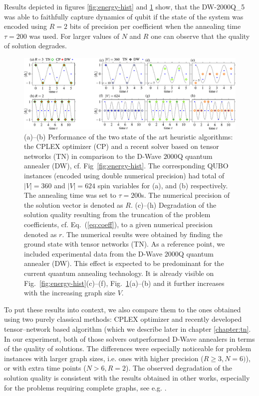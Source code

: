 Results depicted in figures \ref{fig:energy-hist} and \ref{fig:cplex_tn_dwave}
show, that the DW-2000Q\_{5} was able to faithfully capture dynamics of qubit
if the state of the system was encoded using $R=2$ bits of precision per
coefficient when the annealing time $\tau=200$ was used. For larger values of
$N$ and $R$ one can observe that the quality of solution degrades.

\begin{figure}
  \centering
  \includegraphics[width=\textwidth]{figures/fig34_merge.pdf}
  \caption{ (a)--(b) Performance of the two state of the art heuristic
    algorithms: the CPLEX optimizer (CP) and a recent solver based on tensor
    networks (TN) in comparison to the D-Wave $2000$Q quantum annealer (DW),
    cf. Fig~\ref{fig:energy-hist}. The corresponding QUBO instances (encoded
    using double numerical precision) had total of $|V|=360$ and $|V|=624$
    spin variables for (a), and (b) respectively. The annealing time was set
    to $\tau=200$\textmu{}s. The numerical precision of the solution vector is
    denoted as $R$.%
    (c)--(h) Degradation of the solution quality resulting from the truncation
    of the problem coefficients, cf. Eq.~(\ref{eq:coeff}), to a given
    numerical precision denoted as $r$. The numerical results were obtained by
    finding the ground state with tensor networks (TN). As a reference point,
    we included experimental data from the D-Wave $2000$Q quantum annealer
    (DW). This effect is expected to be predominant for the current quantum
    annealing technology. It is already visible on
    Fig.~\ref{fig:energy-hist}(c)--(f), Fig.~\ref{fig:cplex_tn_dwave}(a)--(b)
    and it further increases with the increasing graph size $V$. }
  \label{fig:cplex_tn_dwave}
\end{figure}

To put these results into context, we also compare them to the ones obtained
using two purely classical methods: CPLEX optimizer and recently developed
tensor--network based algorithm (which we describe later in chapter
\ref{chapter:tn}. In our experiment, both of those solvers outperformed D-Wave
annealers in terms of the quality of solutions. The differences were especially
noticeable for problem instances with larger graph sizes, i.e. ones with higher
precision ($R \ge 3, N=6)$), or with extra time points ($N > 6, R = 2$). The
observed degradation of the solution quality is consistent with the results
obtained in other works, especially for the problems requiring complete graphs,
see e.g. \cite{Hamerly2019}.


